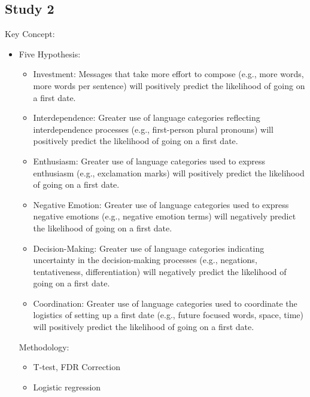 \subsection{Study 2} 
Key Concept: 
\begin{itemize}
    \item Five Hypothesis: 
        \begin{itemize}
            \item Investment: Messages that take more effort to compose (e.g., more words, more words per sentence) will positively predict the likelihood of going on a first date.
            \item Interdependence: Greater use of language categories reflecting interdependence processes (e.g., first-person plural pronouns) will positively predict the likelihood of going on a first date.
            \item Enthusiasm: Greater use of language categories used to express enthusiasm (e.g., exclamation marks) will positively predict the likelihood of going on a first date.
            \item Negative Emotion: Greater use of language categories used to express negative emotions (e.g., negative emotion terms) will negatively predict the likelihood of going on a first date.
            \item Decision-Making: Greater use of language categories indicating uncertainty in the decision-making processes (e.g., negations, tentativeness, differentiation) will negatively predict the likelihood of going on a first date.
            \item Coordination: Greater use of language categories used to coordinate the logistics of setting up a first date (e.g., future focused words, space, time) will positively predict the likelihood of going on a first date.
        \end{itemize}
Methodology: 
    \begin{itemize}
        \item T-test, FDR Correction 
        \item Logistic regression 
    \end{itemize}
\end{itemize}
